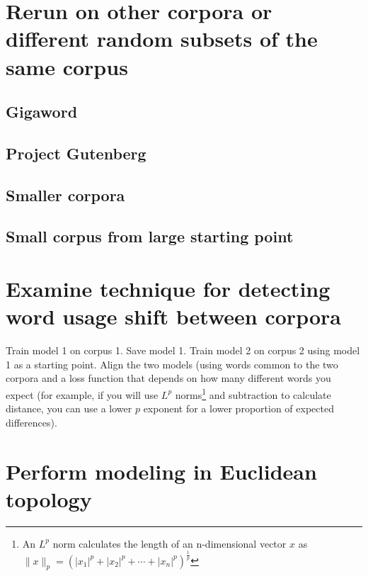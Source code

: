 \documentclass[eric_thesis.tex]{subfiles}
\begin{document}

\section{Rerun on other corpora or different random subsets of the same corpus}


\subsection{Gigaword}
\subsection{Project Gutenberg}
\subsection{Smaller corpora}
\subsection{Small corpus from large starting point}

\section{Examine technique for detecting word usage shift between corpora}

Train model 1 on corpus 1. Save model 1. Train model 2 on corpus 2 using model 1 as a starting point. Align the two models (using words common to the two corpora and a loss function that depends on how many different words you expect (for example, if you will use $L^p$ norms\footnote{An $L^p$ norm calculates the length of an n-dimensional vector $x$ as $\|x\|_p=\left(|x_1|^p+|x_2|^p+\dotsb+|x_n|^p\right)^{\frac{1}{p}}$} and subtraction to calculate distance, you can use a lower $p$ exponent for a lower proportion of expected differences).

\section{Perform modeling in Euclidean topology}
\end{document}
